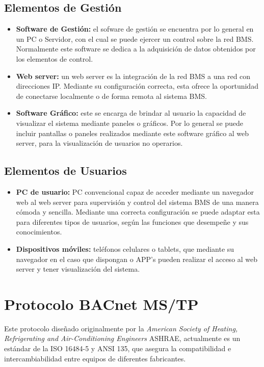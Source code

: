 \subsection{Elementos de Gestión}
\begin{itemize}
\item \textbf{Software de Gestión:}
el sofware de gestión se encuentra por lo general en un PC o Servidor, con el cual se puede ejercer un control sobre la red BMS. Normalmente este software se dedica a la adquisición de datos obtenidos por los elementos de control.
\item \textbf{Web server:}
un web server es la integración de la red BMS a una red con direcciones IP. Mediante su configuración correcta, esta ofrece la oportunidad de conectarse localmente o de forma remota al sistema BMS.
\item \textbf{Software Gráfico:}
este se encarga de brindar al usuario la capacidad de visualizar el sistema mediante paneles o gráficos. Por lo general se puede incluir pantallas o paneles realizados mediante este software gráfico al web server, para la visualización de usuarios no operarios.
\end{itemize}
\subsection{Elementos de Usuarios}
\begin{itemize}
\item \textbf{PC de usuario:}
PC convencional capaz de acceder mediante un navegador web al web server para supervisión y control del sistema BMS de una manera cómoda y sencilla. Mediante una correcta configuración se puede adaptar esta para diferentes tipos de usuarios, según las funciones que desempeñe y sus conocimientos.
\item \textbf{Dispositivos móviles:}
teléfonos celulares o tablets, que mediante su navegador en el caso que dispongan o APP's pueden realizar el acceso al web server y tener visualización del sistema.

\end{itemize}

\section{Protocolo BACnet MS/TP}

Este protocolo diseñado originalmente por la \textit{American Society of Heating, Refrigerating and Air-Conditioning Engineers} ASHRAE, actualmente es un estándar de la ISO 16484-5 y ANSI 135\cite{BACnetProtocol}, que asegura la compatibilidad e intercambiabilidad entre equipos de diferentes fabricantes.

